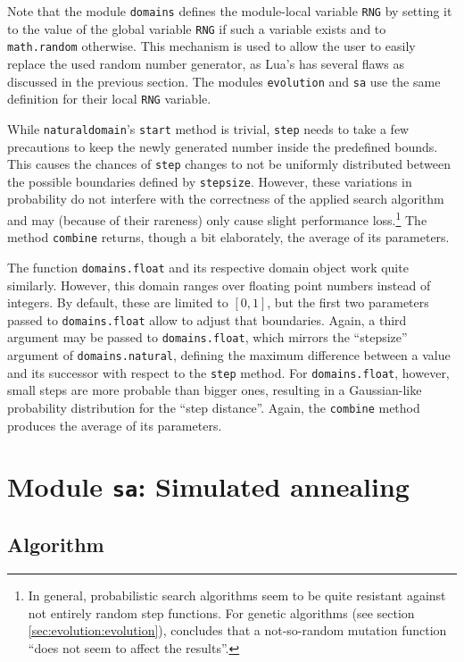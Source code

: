 Note that the module \texttt{domains} defines the module-local variable \texttt{RNG} by setting it to the value of the global variable \texttt{RNG} if such a variable exists and to \texttt{math.random} otherwise. This mechanism is used to allow the user to easily replace the used random number generator, as Lua's has several flaws as discussed in the previous section. The modules \texttt{evolution} and \texttt{sa} use the same definition for their local \texttt{RNG} variable.

While \texttt{naturaldomain}'s \texttt{start} method is trivial, \texttt{step} needs to take a few precautions to keep the newly generated number inside the predefined bounds. This causes the chances of \texttt{step} changes to not be uniformly distributed between the possible boundaries defined by \texttt{stepsize}. However, these variations in probability do not interfere with the correctness of the applied search algorithm and may (because of their rareness) only cause slight performance loss.\footnote{In general, probabilistic search algorithms seem to be quite resistant against not entirely random step functions. For genetic algorithms (see section \ref{sec:evolution:evolution}), \cite{CantuPaz2002} concludes that a not-so-random mutation function ``does not seem to affect the results''.} The method \texttt{combine} returns, though a bit elaborately, the average of its parameters.

The function \texttt{domains.float} and its respective domain object work quite similarly. However, this domain ranges over floating point numbers instead of integers. By default, these are limited to $[0, 1]$, but the first two parameters passed to \texttt{domains.float} allow to adjust that boundaries. Again, a third argument may be passed to \texttt{domains.float}, which mirrors the ``stepsize'' argument of \texttt{domains.natural}, defining the maximum difference between a value and its successor with respect to the \texttt{step} method. For \texttt{domains.float}, however, small steps are more probable than bigger ones, resulting in a Gaussian-like probability distribution for the ``step distance''. Again, the \texttt{combine} method produces the average of its parameters.

\section{Module \texttt{sa}: Simulated annealing}
\label{sec:evolution:sa}

\subsection{Algorithm}

